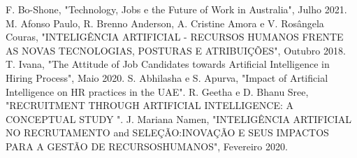 \documentclass[conference]{IEEEtran}
\begin{document}
\begin{thebibliography}{00}
 F. Bo-Shone, "Technology, Jobs e the Future of Work in Australia", Julho 2021.
 M. Afonso Paulo, R. Brenno Anderson, A. Cristine Amora e V. Rosângela Couras, "INTELIGÊNCIA ARTIFICIAL - RECURSOS HUMANOS FRENTE AS NOVAS TECNOLOGIAS, POSTURAS E ATRIBUIÇÕES", Outubro 2018.
 T. Ivana, "The Attitude of Job Candidates towards Artificial Intelligence in Hiring Process", Maio 2020.
 S. Abhilasha e S. Apurva, "Impact of Artificial Intelligence on HR practices in the UAE".
 R. Geetha e D. Bhanu Sree, "RECRUITMENT THROUGH ARTIFICIAL INTELLIGENCE: A CONCEPTUAL STUDY ".
 J. Mariana Namen, "INTELIGÊNCIA ARTIFICIAL NO RECRUTAMENTO and SELEÇÃO:INOVAÇÃO E SEUS IMPACTOS PARA A GESTÃO DE RECURSOSHUMANOS", Fevereiro 2020.
\end{thebibliography}
\vspace{12pt}
\end{document}
